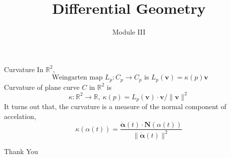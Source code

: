 \documentclass{beamer}
\title{Differential Geometry}
\author{Module III}
\institute{Chapter 10 : The Curvature of Plane Curves}
\begin{document}
\begin{frame}
\maketitle
\end{frame}

\begin{frame}{Curvature}
	In $\mathbb{R}^2$,  
	$$ \text{ Weingarten map }L_p : C_p \to C_p \text{ is }L_p(\boldsymbol{v}) = \kappa(p) \boldsymbol{v}$$
	\vfill
	Curvature of plane curve $C$ in $\mathbb{R}^2$ is
	$$ \kappa : \mathbb{R}^2 \to \mathbb{R},\ \kappa(p) = L_p(\boldsymbol{v}) \cdot \boldsymbol{v}/\| \boldsymbol{v}\|^2 $$
	\vfill
	It turns out that, the curvature is a measure of the normal component of accelation,
	$$ \kappa(\alpha(t)) = \frac{\ddot{\boldsymbol{\alpha}}(t) \cdot \boldsymbol{N}(\alpha(t))}{\| \dot{\boldsymbol{\alpha}}(t)\|^2} $$
\end{frame}

\begin{frame}
	\vspace{0.6in}
	\hspace{3cm} {\color{blue}\Huge{Thank You}}
\end{frame}
\end{document}
